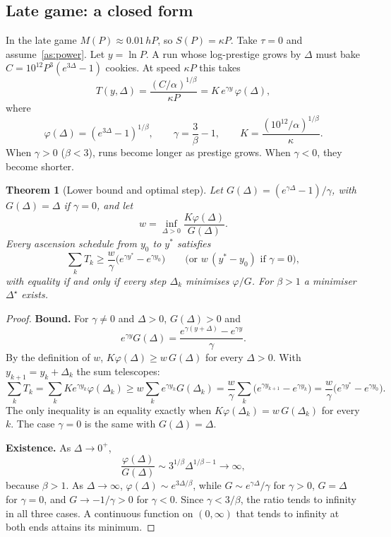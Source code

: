 \documentclass[11pt,a4paper]{article}
\numberwithin{equation}{section}
\newtheorem{theorem}{Theorem}[section]
\theoremstyle{definition}
\theoremstyle{remark}
\newcommand{\proofstep}[1]{\par\addvspace{\medskipamount}\noindent\textbf{#1}\enspace\ignorespaces}
\begin{document}
\subsection{Late game: a closed form}\label{sec:late}
In the late game $M(P)\approx0.01\,hP$, so $S(P)=\kappa P$. Take $\tau=0$ and assume~\ref{as:power}. Let $y=\ln P$. A run whose log-prestige grows by $\Delta$ must bake $C=10^{12}P^3(e^{3\Delta}-1)$ cookies. At speed $\kappa P$ this takes
\begin{equation}\label{eq:runtime}
 T(y,\Delta)=\frac{(C/\alpha)^{1/\beta}}{\kappa P}=K\,e^{\gamma y}\,\varphi(\Delta),
\end{equation}
where
\begin{equation}\label{eq:runtime-parts}
 \varphi(\Delta)=(e^{3\Delta}-1)^{1/\beta},\qquad\gamma=\frac3\beta-1,\qquad K=\frac{(10^{12}/\alpha)^{1/\beta}}\kappa.
\end{equation}
When $\gamma>0$ ($\beta<3$), runs become longer as prestige grows. When $\gamma<0$, they become shorter.

\begin{theorem}[Lower bound and optimal step]\label{thm:lower}
Let $G(\Delta)=(e^{\gamma\Delta}-1)/\gamma$, with $G(\Delta)=\Delta$ if $\gamma=0$, and let
\[
 w=\inf_{\Delta>0}\frac{K\varphi(\Delta)}{G(\Delta)}.
\]
Every ascension schedule from $y_0$ to $y^\ast$ satisfies
\begin{equation}\label{eq:lower}
 \sum_kT_k\ge\frac w\gamma\bigl(e^{\gamma y^\ast}-e^{\gamma y_0}\bigr)
 \qquad\bigl(\text{or }w\,(y^\ast-y_0)\text{ if }\gamma=0\bigr),
\end{equation}
with equality if and only if every step $\Delta_k$ minimises $\varphi/G$. For $\beta>1$ a minimiser $\Delta^\star$ exists.
\end{theorem}

\begin{proof}
\proofstep{Bound.} For $\gamma\ne0$ and $\Delta>0$, $G(\Delta)>0$ and
\[
 e^{\gamma y}G(\Delta)=\frac{e^{\gamma(y+\Delta)}-e^{\gamma y}}\gamma.
\]
By the definition of $w$, $K\varphi(\Delta)\ge w\,G(\Delta)$ for every $\Delta>0$. With $y_{k+1}=y_k+\Delta_k$ the sum telescopes:
\[
 \sum_kT_k=\sum_kKe^{\gamma y_k}\varphi(\Delta_k)\ge w\sum_ke^{\gamma y_k}G(\Delta_k)
 =\frac w\gamma\sum_k\bigl(e^{\gamma y_{k+1}}-e^{\gamma y_k}\bigr)=\frac w\gamma\bigl(e^{\gamma y^\ast}-e^{\gamma y_0}\bigr).
\]
The only inequality is an equality exactly when $K\varphi(\Delta_k)=w\,G(\Delta_k)$ for every $k$. The case $\gamma=0$ is the same with $G(\Delta)=\Delta$.

\proofstep{Existence.} As $\Delta\to0^+$,
\[
 \frac{\varphi(\Delta)}{G(\Delta)}\sim3^{1/\beta}\Delta^{1/\beta-1}\to\infty,
\]
because $\beta>1$. As $\Delta\to\infty$, $\varphi(\Delta)\sim e^{3\Delta/\beta}$, while $G\sim e^{\gamma\Delta}/\gamma$ for $\gamma>0$, $G=\Delta$ for $\gamma=0$, and $G\to-1/\gamma>0$ for $\gamma<0$. Since $\gamma<3/\beta$, the ratio tends to infinity in all three cases. A continuous function on $(0,\infty)$ that tends to infinity at both ends attains its minimum.
\end{proof}
\end{document}
